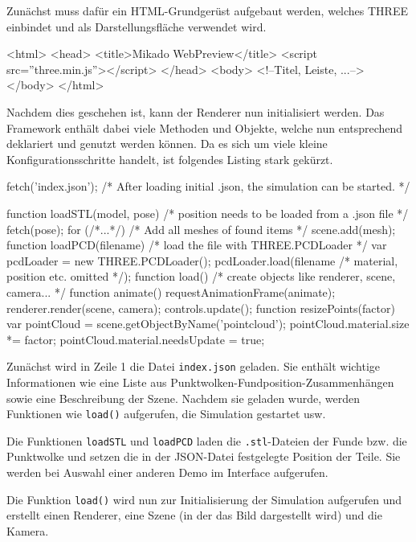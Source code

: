 Zunächst muss dafür ein HTML-Grundgerüst aufgebaut werden, welches THREE einbindet
und als Darstellungsfläche verwendet wird.

\begin{code}[language=html, caption={HTML-Gerüst für die WebPreview}]
<html>
	<head>
		<title>Mikado WebPreview</title>
		<script src=''three.min.js''></script>
	</head>
	<body>
		<!--Titel, Leiste, ...-->
	</body>
</html>
\end{code}

Nachdem dies geschehen ist, kann der Renderer nun initialisiert werden. Das Framework
enthält dabei viele Methoden und Objekte, welche nun entsprechend deklariert und
genutzt werden können. Da es sich um viele kleine Konfigurationsschritte handelt,
ist folgendes Listing stark gekürzt.

\begin{code}[language=javascript, caption={Initialisierung von \texttt{THREE.js}}]
fetch('index.json');
/* After loading initial .json, the simulation can be started. */

function loadSTL(model, pose) {
	/* position needs to be loaded from a .json file */
	fetch(pose);
	for (/*...*/) {
		/* Add all meshes of found items */
		scene.add(mesh);
	}
}
function loadPCD(filename) {
	/* load the file with THREE.PCDLoader */
	var pcdLoader = new THREE.PCDLoader();
	pcdLoader.load(filename /* material, position etc. omitted */);
}
function load() {
	/* create objects like renderer, scene, camera... */
}
function animate() {
	requestAnimationFrame(animate);
	renderer.render(scene, camera);
	controls.update();
}
function resizePoints(factor) {
	var pointCloud = scene.getObjectByName('pointcloud');
	pointCloud.material.size *= factor;
	pointCloud.material.needsUpdate = true;
}
\end{code}

Zunächst wird in Zeile 1 die Datei \texttt{index.json} geladen. Sie enthält wichtige Informationen wie eine Liste aus Punktwolken-Fundposition-Zusammenhängen sowie eine Beschreibung der Szene. Nachdem sie geladen wurde, werden Funktionen wie \texttt{load()} aufgerufen, die Simulation gestartet usw.

Die Funktionen \texttt{loadSTL} und \texttt{loadPCD} laden die \texttt{.stl}-Dateien der Funde bzw. die Punktwolke und setzen die in der JSON-Datei festgelegte Position der Teile. Sie werden bei Auswahl einer anderen Demo im Interface aufgerufen.

Die Funktion \texttt{load()} wird nun zur Initialisierung der Simulation aufgerufen und erstellt
einen Renderer, eine Szene (in der das Bild dargestellt wird) und die Kamera.

